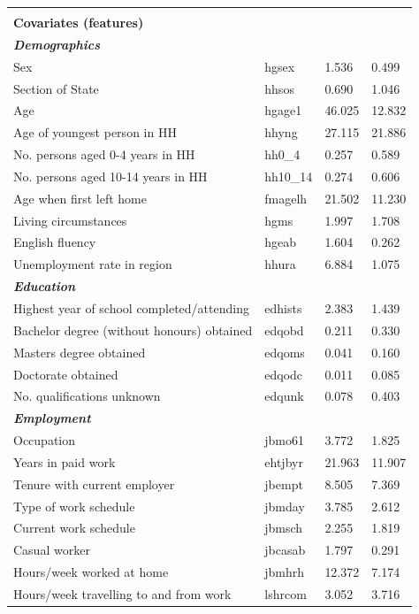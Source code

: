 \documentclass[12pt, a4paper]{article}
\begin{document}
\begin{landscape}
\begin{longtable}{p{} C{0.2\textwidth} C{0.2\textwidth} C{0.2\textwidth}}
&  & & \\
\textbf{Covariates (features)} 	& 		 & 		 & 		 \\
\textbf{\textit{Demographics}} 	& 		 & 		 & 		 \\
Sex 	& 	hgsex	 & 	1.536	 & 	0.499	 \\
Section of State 	& 	hhsos	 & 	0.690	 & 	1.046	 \\
Age 	& 	hgage1	 & 	46.025	 & 	12.832	 \\
Age of youngest person in HH 	& 	hhyng	 & 	27.115	 & 	21.886	 \\
No.  persons aged 0-4 years in HH 	& 	hh0\_4	 & 	0.257	 & 	0.589	 \\
No.  persons aged 10-14 years in HH 	& 	hh10\_14	 & 	0.274	 & 	0.606	 \\
Age when first left home 	& 	fmagelh	 & 	21.502	 & 	11.230	 \\
Living circumstances 	& 	hgms	 & 	1.997	 & 	1.708	 \\
English fluency 	& 	hgeab	 & 	1.604	 & 	0.262	 \\
Unemployment rate in region	& 	hhura	 & 	6.884	 & 	1.075	 \\
\textbf{\textit{Education}} 	& 		 & 		 & 		 \\
Highest year of school completed/attending 	& 	edhists	 & 	2.383	 & 	1.439	 \\
Bachelor degree (without honours) obtained 	& 	edqobd	 & 	0.211	 & 	0.330	 \\
Masters degree obtained 	& 	edqoms	 & 	0.041	 & 	0.160	 \\
Doctorate obtained 	& 	edqodc	 & 	0.011	 & 	0.085	 \\
No.  qualifications unknown 	& 	edqunk	 & 	0.078	 & 	0.403	 \\
\textbf{\textit{Employment}} 	& 		 & 		 & 		 \\
Occupation 	& 	jbmo61	 & 	3.772	 & 	1.825	 \\
Years in paid work 	& 	ehtjbyr	 & 	21.963	 & 	11.907	 \\
Tenure with current employer 	& 	jbempt	 & 	8.505	 & 	7.369	 \\
Type of work schedule 	& 	jbmday	 & 	3.785	 & 	2.612	 \\
Current work schedule 	& 	jbmsch	 & 	2.255	 & 	1.819	 \\
Casual worker 	& 	jbcasab	 & 	1.797	 & 	0.291	 \\
Hours/week worked at home 	& 	jbmhrh	 & 	12.372	 & 	7.174	 \\
Hours/week travelling to and from work 	& 	lshrcom	 & 	3.052	 & 	3.716	 \\

\end{longtable}
\end{landscape}
\end{document}
